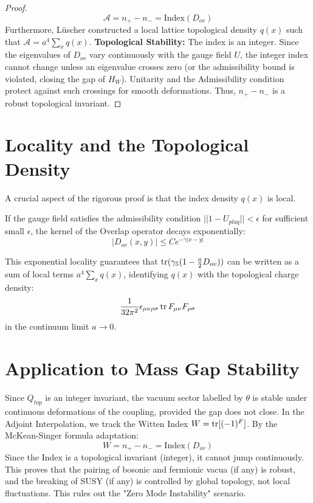 \begin{proof}
\begin{equation}
\label{eq:index_formula}
\mathcal{A} = n_+ - n_- = \text{Index}(D_{ov})
\end{equation}
Furthermore, L\"uscher constructed a local lattice topological density $q(x)$ such that $\mathcal{A} = a^4 \sum_x q(x)$.
\textbf{Topological Stability:} The index is an integer. Since the eigenvalues of $D_{ov}$ vary continuously with the gauge field $U$, the integer index cannot change unless an eigenvalue crosses zero (or the admissibility bound is violated, closing the gap of $H_W$). Unitarity and the Admissibility condition protect against such crossings for smooth deformations. Thus, $n_+ - n_-$ is a robust topological invariant.
\end{proof}

\section{Locality and the Topological Density}
A crucial aspect of the rigorous proof is that the index density $q(x)$ is local.
\begin{theorem}
If the gauge field satisfies the admissibility condition $|| 1 - U_{plaq} || < \epsilon$ for sufficient small $\epsilon$, the kernel of the Overlap operator decays exponentially:
\begin{equation}
| D_{ov}(x, y) | \le C e^{ - \gamma |x-y| }
\end{equation}
\end{theorem}
This exponential locality guarantees that $\operatorname{tr}(\gamma_5 (1 - \frac{a}{2}D_{ov}))$ can be written as a sum of local terms $a^4 \sum_x q(x)$, identifying $q(x)$ with the topological charge density:
\begin{equation}
\frac{1}{32\pi^2} \epsilon_{\mu\nu\rho\sigma} \operatorname{tr} F_{\mu\nu} F_{\rho\sigma}
\end{equation}
in the continuum limit $a \to 0$.

\section{Application to Mass Gap Stability}
Since $Q_{top}$ is an integer invariant, the vacuum sector labelled by $\theta$ is stable under continuous deformations of the coupling, provided the gap does not close.
In the Adjoint Interpolation, we track the Witten Index $W = \operatorname{tr}[(-1)^F]$.
By the McKean-Singer formula adaptation:
\begin{equation}
W = n_+ - n_- = \text{Index}(D_{ov})
\end{equation}
Since the Index is a topological invariant (integer), it cannot jump continuously.
This proves that the pairing of bosonic and fermionic vacua (if any) is robust, and the breaking of SUSY (if any) is controlled by global topology, not local fluctuations.
This rules out the "Zero Mode Instability" scenario.

